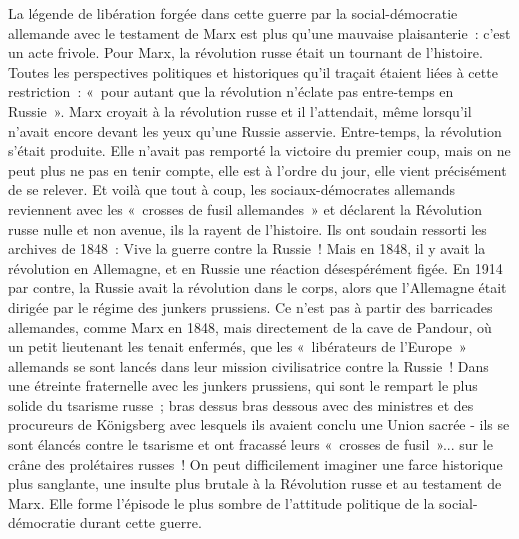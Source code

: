 \documentclass[french,twoside]{book} %
\begin{document}
La légende de libération forgée dans cette guerre par la social-démocratie allemande avec le testament de Marx est plus qu’une mauvaise plaisanterie : c’est un acte frivole. Pour Marx, la révolution russe était un tournant de l’histoire. Toutes les perspectives politiques et historiques qu’il traçait étaient liées à cette restriction : « pour autant que la révolution n’éclate pas entre-temps en Russie ». Marx croyait à la révolution russe et il l’attendait, même lorsqu’il n’avait encore devant les yeux qu’une Russie asservie. Entre-temps, la révolution s’était produite. Elle n’avait pas remporté la victoire du premier coup, mais on ne peut plus ne pas en tenir compte, elle est à l’ordre du jour, elle vient précisément de se relever. Et voilà que tout à coup, les sociaux-démocrates allemands reviennent avec les « crosses de fusil allemandes » et déclarent la Révolution russe nulle et non avenue, ils la rayent de l’histoire. Ils ont soudain ressorti les archives de 1848 : Vive la guerre contre la Russie ! Mais en 1848, il y avait la révolution en Allemagne, et en Russie une réaction désespérément figée. En 1914 par contre, la Russie avait la révolution dans le corps, alors que l’Allemagne était dirigée par le régime des junkers prussiens. Ce n’est pas à partir des barricades allemandes, comme Marx en 1848, mais directement de la cave de Pandour, où un petit lieutenant les tenait enfermés, que les « libérateurs de l’Europe » allemands se sont lancés dans leur mission civilisatrice contre la Russie ! Dans une étreinte fraternelle avec les junkers prussiens, qui sont le rempart le plus solide du tsarisme russe ; bras dessus bras dessous avec des ministres et des procureurs de Königsberg avec lesquels ils avaient conclu une Union sacrée - ils se sont élancés contre le tsarisme et ont fracassé leurs « crosses de fusil »... sur le crâne des prolétaires russes ! On peut difficilement imaginer une farce historique plus sanglante, une insulte plus brutale à la Révolution russe et au testament de Marx. Elle forme l’épisode le plus sombre de l’attitude politique de la social-démocratie durant cette guerre.\par
\end{document}
